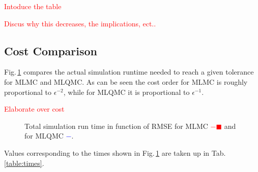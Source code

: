 \documentclass{ICASP13Paper}
\begin{document}
\textcolor{red}{Intoduce the table}

\begin{table}[H]
\caption{Parameters for the MLMC and MLQMC algorithm.}
\centering
\label{tab:Parameters for the MLMC  and MLQMC algorithm}
\end{table}

\textcolor{red}{Discus why this decreases, the implications, ect..}

\subsection{Cost Comparison}
Fig.\,\ref{fig:Runtime} compares the actual simulation runtime needed to reach a given tolerance for MLMC and MLQMC. As can be seen the cost order for MLMC is roughly proportional to $\epsilon^{-2}$, while for MLQMC it is proportional to $\epsilon^{-1}$.

\textcolor{red}{Elaborate over cost}
\begin{figure}[H]
\centering
\scalebox{0.65}{
}
 \caption{\label{fig:time}Total simulation run time in function of RMSE for MLMC \textcolor{red}{$-\blacksquare $} and for MLQMC \textcolor{blue}{$-$\protect{}}.}
 \label{fig:Runtime}
\end{figure}

Values corresponding to the times shown in Fig.\,\ref{fig:Runtime} are taken up in Tab.\,\ref{table:times}.
\end{document}
